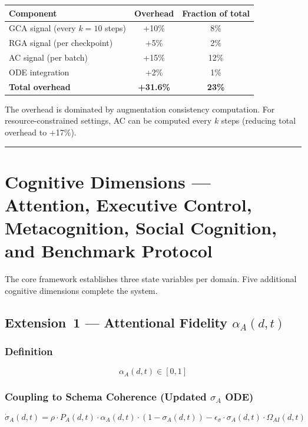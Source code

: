 \documentclass[11pt,a4paper]{article}
\begin{document}
\begin{center}
\begin{tabular}{l c c}
\toprule
\textbf{Component} & \textbf{Overhead} & \textbf{Fraction of total} \\
\midrule
GCA signal (every $k=10$ steps) & +10\% & 8\% \\
RGA signal (per checkpoint) & +5\% & 2\% \\
AC signal (per batch) & +15\% & 12\% \\
ODE integration & +2\% & 1\% \\
\midrule
\textbf{Total overhead} & \textbf{+31.6\%} & \textbf{23\%} \\
\bottomrule
\end{tabular}
\end{center}

The overhead is dominated by augmentation consistency computation.
For resource-constrained settings, AC can be computed every $k$ steps
(reducing total overhead to +17\%).

\noindent\rule{\linewidth}{0.4pt}

\section{Cognitive Dimensions --- Attention, Executive Control,
Metacognition, Social Cognition, and Benchmark Protocol}\label{sec:cognitive-dimensions}

The core framework establishes three state variables per domain. Five
additional cognitive dimensions complete the system.

\subsection{Extension~1 --- Attentional Fidelity \texorpdfstring{$\alpha_A(d,t)$}{alpha\_A(d,t)}}\label{sec:attention}

\subsubsection{Definition}
\begin{equation}\label{eq:alpha-bounds}
\alpha_A(d,t) \in [0,1]
\end{equation}

\subsubsection{Coupling to Schema Coherence (Updated \texorpdfstring{$\sigma_A$}{sigma\_A} ODE)}
\begin{equation}\label{eq:sigma-ode}
\dot{\sigma}_A(d,t) = \rho \cdot P_A(d,t) \cdot \alpha_A(d,t) \cdot (1 - \sigma_A(d,t)) - \epsilon_{\sigma} \cdot \sigma_A(d,t) \cdot \Omega_{AI}(d,t)
\end{equation}
\end{document}
